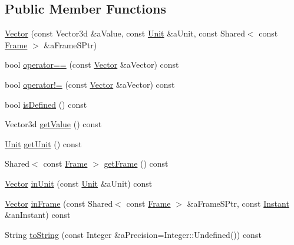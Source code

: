 \subsection*{Public Member Functions}
\begin{DoxyCompactItemize}
\item 
\hyperlink{classlibrary_1_1physics_1_1data_1_1_vector_a1e94a0820c3d865d5c30214ad180da4b}{Vector} (const Vector3d \&a\+Value, const \hyperlink{classlibrary_1_1physics_1_1_unit}{Unit} \&a\+Unit, const Shared$<$ const \hyperlink{classlibrary_1_1physics_1_1coord_1_1_frame}{Frame} $>$ \&a\+Frame\+S\+Ptr)
\item 
bool \hyperlink{classlibrary_1_1physics_1_1data_1_1_vector_a1fd3ad788a7cf055b94e41ea3d144dcf}{operator==} (const \hyperlink{classlibrary_1_1physics_1_1data_1_1_vector}{Vector} \&a\+Vector) const
\item 
bool \hyperlink{classlibrary_1_1physics_1_1data_1_1_vector_a18ee3fb47062c710c17f4e07a02d2718}{operator!=} (const \hyperlink{classlibrary_1_1physics_1_1data_1_1_vector}{Vector} \&a\+Vector) const
\item 
bool \hyperlink{classlibrary_1_1physics_1_1data_1_1_vector_a6da3d60255221e61124c2f98811116c5}{is\+Defined} () const
\item 
Vector3d \hyperlink{classlibrary_1_1physics_1_1data_1_1_vector_ae15343639a44b9b4c5f613e56b50e3a6}{get\+Value} () const
\item 
\hyperlink{classlibrary_1_1physics_1_1_unit}{Unit} \hyperlink{classlibrary_1_1physics_1_1data_1_1_vector_a647b1c8a5e20595d0a845315b986c83e}{get\+Unit} () const
\item 
Shared$<$ const \hyperlink{classlibrary_1_1physics_1_1coord_1_1_frame}{Frame} $>$ \hyperlink{classlibrary_1_1physics_1_1data_1_1_vector_aca18b6c7aca796a7aa75c7cbd18da953}{get\+Frame} () const
\item 
\hyperlink{classlibrary_1_1physics_1_1data_1_1_vector}{Vector} \hyperlink{classlibrary_1_1physics_1_1data_1_1_vector_a3d39e6e9951f1698d72d0077dc7bfc07}{in\+Unit} (const \hyperlink{classlibrary_1_1physics_1_1_unit}{Unit} \&a\+Unit) const
\item 
\hyperlink{classlibrary_1_1physics_1_1data_1_1_vector}{Vector} \hyperlink{classlibrary_1_1physics_1_1data_1_1_vector_ae9375ac11960387b3d93f59501878eff}{in\+Frame} (const Shared$<$ const \hyperlink{classlibrary_1_1physics_1_1coord_1_1_frame}{Frame} $>$ \&a\+Frame\+S\+Ptr, const \hyperlink{classlibrary_1_1physics_1_1time_1_1_instant}{Instant} \&an\+Instant) const
\item 
String \hyperlink{classlibrary_1_1physics_1_1data_1_1_vector_adce52d653ad603ab2b4ef20cf477fada}{to\+String} (const Integer \&a\+Precision=Integer\+::\+Undefined()) const
\end{DoxyCompactItemize}
